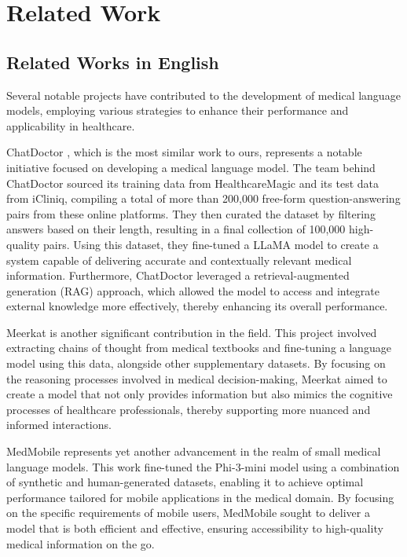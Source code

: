 \documentclass[conference]{IEEEtran}
\begin{document}
	\section{Related Work}
	
	\subsection{Related Works in English}
	Several notable projects have contributed to the development of medical language models, employing various strategies to enhance their performance and applicability in healthcare.
	
	ChatDoctor
	\cite{b6}, which is the most similar work to ours, represents a notable initiative focused on developing a medical language model. The team behind ChatDoctor sourced its training data from HealthcareMagic and its test data from iCliniq, compiling a total of more than 200,000 free-form question-answering pairs from these online platforms. They then curated the dataset by filtering answers based on their length, resulting in a final collection of 100,000 high-quality pairs. Using this dataset, they fine-tuned a LLaMA model \cite{b7} to create a system capable of delivering accurate and contextually relevant medical information. Furthermore, ChatDoctor leveraged a retrieval-augmented generation (RAG) approach, which allowed the model to access and integrate external knowledge more effectively, thereby enhancing its overall performance.
	
	Meerkat
	\cite{b8}
	is another significant contribution in the field. This project involved extracting chains of thought from medical textbooks and fine-tuning a language model using this data, alongside other supplementary datasets. By focusing on the reasoning processes involved in medical decision-making, Meerkat aimed to create a model that not only provides information but also mimics the cognitive processes of healthcare professionals, thereby supporting more nuanced and informed interactions.
	
	MedMobile
	\cite{b9}
	represents yet another advancement in the realm of small medical language models. This work fine-tuned the Phi-3-mini model
	\cite{b10}
	using a combination of synthetic and human-generated datasets, enabling it to achieve optimal performance tailored for mobile applications in the medical domain. By focusing on the specific requirements of mobile users, MedMobile sought to deliver a model that is both efficient and effective, ensuring accessibility to high-quality medical information on the go.
\end{document}
